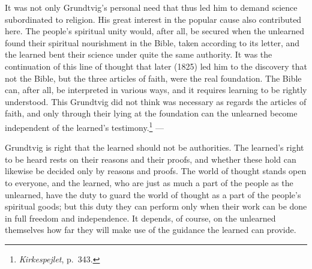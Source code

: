 \documentclass[12pt,a4paper]{book}
\newcommand{\opage}[1]{\marginnote{\footnotesize\textit{[#1]}}}
\begin{document}
It was not only Grundtvig's personal need that thus led him to demand science
subordinated to religion. His great interest in the popular cause also contributed
here. The people's spiritual unity would, after all, be secured when the unlearned
found their spiritual nourishment in the Bible, taken according to its letter, and the
learned bent their science under quite the same authority. It was the continuation of
this line of thought that later (1825) led him to the discovery that not the Bible, but
the three articles of faith, were the real foundation. The Bible can, after all, be
interpreted in various ways, and it requires learning to be rightly understood. This
Grundtvig did not think was necessary as regards the articles of faith, and only
through their lying at the foundation can the unlearned become independent of the
learned's testimony.\footnote{\emph{Kirkespejlet}, p.~343.} ---

Grundtvig is right that the learned should not be authorities. The learned's right to
be heard rests on their reasons and their proofs, and whether these hold can likewise
be decided only by reasons and proofs. The world of thought stands open to \opage{64}everyone,
and the learned, who are just as much a part of the people as the unlearned, have the
duty to guard the world of thought as a part of the people's spiritual goods; but this
duty they can perform only when their work can be done in full freedom and
independence. It depends, of course, on the unlearned themselves how far they will make
use of the guidance the learned can provide.
\end{document}
